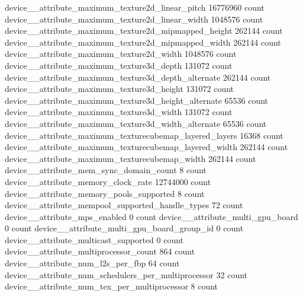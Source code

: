 device__attribute_maximum_texture2d_linear_pitch                                        16776960 count
device__attribute_maximum_texture2d_linear_width                                         1048576 count
device__attribute_maximum_texture2d_mipmapped_height                                      262144 count
device__attribute_maximum_texture2d_mipmapped_width                                       262144 count
device__attribute_maximum_texture2d_width                                                1048576 count
device__attribute_maximum_texture3d_depth                                                 131072 count
device__attribute_maximum_texture3d_depth_alternate                                       262144 count
device__attribute_maximum_texture3d_height                                                131072 count
device__attribute_maximum_texture3d_height_alternate                                       65536 count
device__attribute_maximum_texture3d_width                                                 131072 count
device__attribute_maximum_texture3d_width_alternate                                        65536 count
device__attribute_maximum_texturecubemap_layered_layers                                    16368 count
device__attribute_maximum_texturecubemap_layered_width                                    262144 count
device__attribute_maximum_texturecubemap_width                                            262144 count
device__attribute_mem_sync_domain_count                                                        8 count
device__attribute_memory_clock_rate                                                     12744000 count
device__attribute_memory_pools_supported                                                       8 count
device__attribute_mempool_supported_handle_types                                              72 count
device__attribute_mps_enabled                                                                  0 count
device__attribute_multi_gpu_board                                                              0 count
device__attribute_multi_gpu_board_group_id                                                     0 count
device__attribute_multicast_supported                                                          0 count
device__attribute_multiprocessor_count                                                       864 count
device__attribute_num_l2s_per_fbp                                                             64 count
device__attribute_num_schedulers_per_multiprocessor                                           32 count
device__attribute_num_tex_per_multiprocessor                                                   8 count
